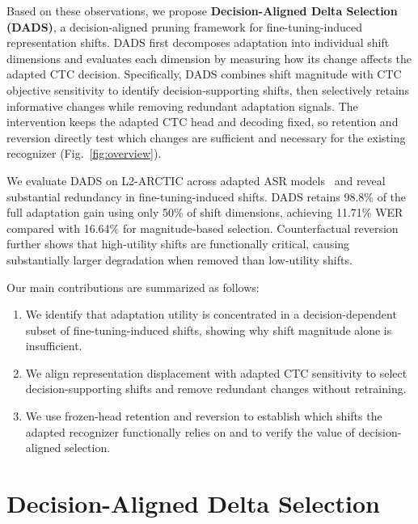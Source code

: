 \documentclass{article}
\begin{document}
Based on these observations, we propose \textbf{Decision-Aligned Delta Selection (DADS)}, a decision-aligned pruning framework for fine-tuning-induced representation shifts. DADS first decomposes adaptation into individual shift dimensions and evaluates each dimension by measuring how its change affects the adapted CTC decision. Specifically, DADS combines shift magnitude with CTC objective sensitivity to identify decision-supporting shifts, then selectively retains informative changes while removing redundant adaptation signals. The intervention keeps the adapted CTC head and decoding fixed, so retention and reversion directly test which changes are sufficient and necessary for the existing recognizer (Fig.~\ref{fig:overview}).

We evaluate DADS on L2-ARCTIC across adapted ASR models~\cite{zhao2018l2arctic} and reveal substantial redundancy in fine-tuning-induced shifts. DADS retains 98.8\% of the full adaptation gain using only 50\% of shift dimensions, achieving 11.71\% WER compared with 16.64\% for magnitude-based selection. Counterfactual reversion further shows that high-utility shifts are functionally critical, causing substantially larger degradation when removed than low-utility shifts.

Our main contributions are summarized as follows:
\begin{enumerate}
\setlength{\itemsep}{2pt}
\setlength{\parsep}{0pt}
\item We identify that adaptation utility is concentrated in a decision-dependent subset of fine-tuning-induced shifts, showing why shift magnitude alone is insufficient.
\item We align representation displacement with adapted CTC sensitivity to select decision-supporting shifts and remove redundant changes without retraining.
\item We use frozen-head retention and reversion to establish which shifts the adapted recognizer functionally relies on and to verify the value of decision-aligned selection.
\end{enumerate}



\section{Decision-Aligned Delta Selection}
\label{sec:method}
\end{document}
